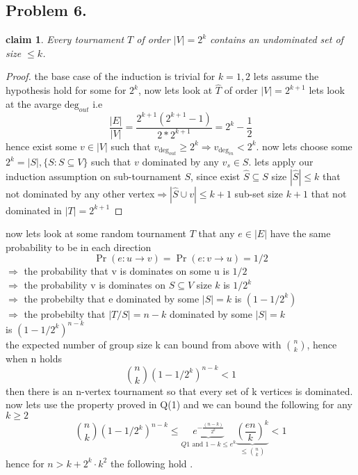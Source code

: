 \documentclass[12pt]{article}
\newtheorem*{claim*}{claim}
\begin{document}
\subsection*{Problem 6.}
\begin{claim*}
Every tournament $T$ of order $|V|=2^k$ contains an undominated set of size $\leq k$.
\end{claim*}
\begin{proof}
the base case of the induction is trivial for $k=1,2$
lets assume the hypothesis hold for some for $2^k$, now lets look at $\hat{T}$ of order $|V|=2^{k+1}$ lets look at the avarge $\text{deg}_{out}$ i.e
\[
  \frac{|E|}{|V|} = \dfrac{2^{k+1}(2^{k+1}-1)}{2*2^{k+1}}=2^k-\dfrac{1}{2}
\]
hence exist some $v \in |V|$ such that $v_{\text{deg}_{out}}\geq 2^k \Rightarrow v_{\text{deg}_{in}} < 2^k$.  now lets choose 
some $2^k = |S|,\lbrace S:S \subseteq V \rbrace$ such that $v$ dominated by any  $v_s\in S$.
lets apply our induction assumption on sub-tournament $S$,
since exist  $\hat{S} \subseteq S$
size $ | \hat{S} | \leq k$ that not dominated by any other vertex$\Rightarrow |\hat{S}\cup{v}|\leq k+1$ sub-set size $k+1$ that not dominated in $|T|=2^{k+1}$

\end{proof}
now lets look at some random tournament $T$ that any $e\in |E|$ have the same probability to be in each direction \[
 \Pr (e: u \rightarrow v)=
 \Pr (e: v \rightarrow u)=1/2
\]
 $\Rightarrow$ the probability that  v is dominates on some u is $1/2$
\\ $\Rightarrow$  the probability v is dominates on $S\subseteq V$ size $k$ is $1/2^k$
\\$\Rightarrow$  the probebilty that e dominated by some $|S|=k$ is $(1-1/2^k)$ 
\\$\Rightarrow$  the probebilty that $|T/S|=n-k$ dominated by some $|S|=k$ 
\\is $(1-1/2^k)^{n-k}$ 
\\the expected number of group size k can bound from above with $n \choose k$, hence when n  holds
\[
\binom{n}{k}(1-1/2^k)^{n-k} <1
\]
then there is an n-vertex tournament so that every set of k vertices is dominated.\\
now lets use the property proved in Q(1) and we can bound the following for any $k\geq 2$
\[
\binom{n}{k}(1-1/2^k)^{n-k} \leq 
\underbrace{e^{-\frac{(n-k)}{2^k}}}_{Q1 \text{ and }1-k
\leq e^k} \underbrace{\left(\dfrac{en}{k}\right)^k}_{\leq \binom{n}{k}}<1
\]
hence for $n>k+2^k\cdot k^2$ the  following hold .
\end{document}
